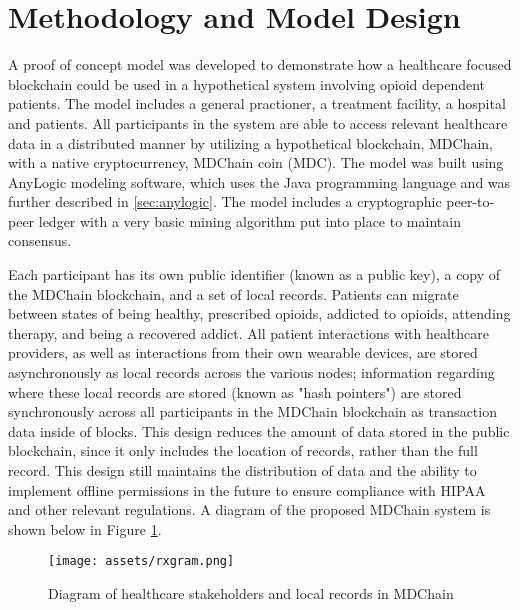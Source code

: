\documentclass[12pt]{report}
\begin{document}
\section{Methodology and Model Design}
A proof of concept model was developed to demonstrate how a healthcare focused blockchain could be used in a hypothetical system involving opioid dependent patients. The model includes a general practioner, a treatment facility, a hospital and patients. All participants in the system are able to access relevant healthcare data in a distributed manner by utilizing a hypothetical blockchain, MDChain, with a native cryptocurrency, MDChain coin (MDC). The model was built using AnyLogic modeling software, which uses the Java programming language and was further described in \autoref{sec:anylogic}. The model includes a cryptographic peer-to-peer ledger with a very basic mining algorithm put into place to maintain consensus.

Each participant has its own public identifier (known as a public key), a copy of the MDChain blockchain, and a set of local records. Patients can migrate between states of being healthy, prescribed opioids, addicted to opioids, attending therapy, and being a recovered addict. All patient interactions with healthcare providers, as well as interactions from their own wearable devices, are stored asynchronously as local records across the various nodes; information regarding where these local records are stored (known as "hash pointers") are stored synchronously across all participants in the MDChain blockchain as transaction data inside of blocks. This design reduces the amount of data stored in the public blockchain, since it only includes the location of records, rather than the full record. This design still maintains the distribution of data and the ability to implement offline permissions in the future to ensure compliance with HIPAA and other relevant regulations. A diagram of the proposed MDChain system is shown below in Figure \ref{fig:rxgram}.

\begin{figure}[!h]
\begin{center}
\texttt{[image: assets/rxgram.png]}
\end{center}
\caption{Diagram of healthcare stakeholders and local records in MDChain}
\label{fig:rxgram}
\end{figure}
\end{document}
